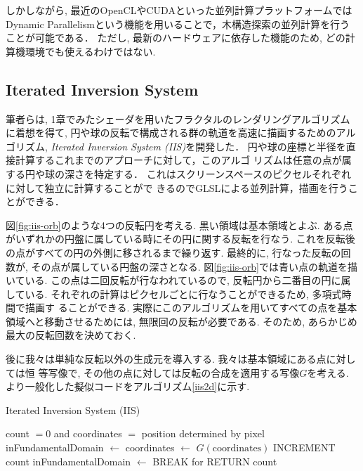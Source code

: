しかしながら, 最近のOpenCLやCUDAといった並列計算プラットフォームでは
Dynamic Parallelismという機能を用いることで，木構造探索の並列計算を行う
ことが可能である．
ただし, 最新のハードウェアに依存した機能のため, どの計算機環境でも使えるわけではない.

\subsection{Iterated Inversion System}

筆者らは, 1章でみたシェーダを用いたフラクタルのレンダリングアルゴリズム
に着想を得て, 円や球の反転で構成される群の軌道を高速に描画するためのアル
ゴリズム, \textit{Iterated Inversion System (IIS)}\cite{iis}を開発した．
円や球の座標と半径を直接計算するこれまでのアプローチに対して，このアルゴ
リズムは任意の点が属する円や球の深さを特定する．
これはスクリーンスペースのピクセルそれぞれに対して独立に計算することがで
きるのでGLSLによる並列計算，描画を行うことができる．

図\ref{fig:iis-orb}のような4つの反転円を考える.
黒い領域は基本領域とよぶ.
ある点がいずれかの円盤に属している時にその円に関する反転を行なう.
これを反転後の点がすべての円の外側に移されるまで繰り返す.
最終的に, 行なった反転の回数が, その点が属している円盤の深さとなる.
図\ref{fig:iis-orb}では青い点の軌道を描いている.
この点は二回反転が行なわれているので, 反転円から二番目の円に属している.
それぞれの計算はピクセルごとに行なうことができるため, 多項式時間で描画す
ることができる.
実際にこのアルゴリズムを用いてすべての点を基本領域へと移動させるためには,
無限回の反転が必要である. そのため, あらかじめ最大の反転回数を決めておく.

後に我々は単純な反転以外の生成元を導入する. 我々は基本領域にある点に対しては恒
等写像で, その他の点に対しては反転の合成を適用する写像$G$を考える.
より一般化した擬似コードをアルゴリズム\ref{iis2d}に示す.

 \begin{algorithm}
  \caption{Iterated Inversion System (IIS)}
  \label{iis2d}
  \begin{algorithmic}
   \REQUIRE count $= 0$ and coordinates $=$ position determined by
   pixel
   \STATE inFundamentalDomain $\leftarrow$ \TRUE
   \STATE coordinates $\leftarrow$ $G(\text{coordinates})$
   \STATE INCREMENT count
   \STATE inFundamentalDomain $\leftarrow$ \FALSE
   \ENDIF
   \ENDFOR
   \STATE BREAK for
   \ENDIF
   \ENDFOR
   \STATE RETURN count
  \end{algorithmic}
 \end{algorithm}

